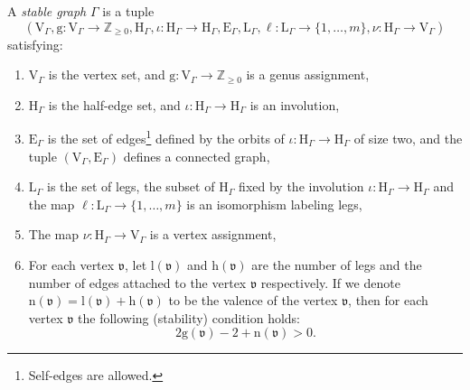 \documentclass[12pt]{amsart}
\numberwithin{equation}{section}
\begin{document}
A \textit{stable graph} $\Gamma$ is a tuple
\begin{equation*}
\left(\mathrm{V}_{\Gamma}, \mathrm{g}: \mathrm{V}_{\Gamma} \rightarrow \mathbb{Z}_{\geq 0},  \mathrm{H}_{\Gamma}, \iota: \mathrm{H}_{\Gamma} \rightarrow \mathrm{H}_{\Gamma}, \mathrm{E}_{\Gamma}, \mathrm{L}_{\Gamma}, \ell:\mathrm{L}_{\Gamma}\rightarrow\{1,\ldots,m\},  \nu: \mathrm{H}_{\Gamma} \rightarrow \mathrm{V}_{\Gamma}\right)
\end{equation*}
satisfying:
\begin{enumerate}
\item $\mathrm{V}_{\Gamma}$ is the vertex set, and $\mathrm{g}:\mathrm{V}_{\Gamma}\rightarrow\mathbb{Z}_{\geq 0}$ is a genus assignment,
    
\item $\mathrm{H}_{\Gamma}$ is the half-edge set, and $\iota: \mathrm{H}_{\Gamma} \rightarrow \mathrm{H}_{\Gamma}$ is an involution,
    
\item $\mathrm{E}_{\Gamma}$ is the set of edges\footnote{Self-edges are allowed.} defined by the orbits of $\iota: \mathrm{H}_{\Gamma} \rightarrow \mathrm{H}_{\Gamma}$ of size two, and the tuple $\left(\mathrm{V}_{\Gamma},\mathrm{E}_{\Gamma}\right)$ defines a connected graph,
    
\item $\mathrm{L}_{\Gamma}$ is the set of legs, the subset of $\mathrm{H}_{\Gamma}$ fixed by the involution $\iota: \mathrm{H}_{\Gamma} \rightarrow \mathrm{H}_{\Gamma}$ and the map $\ell:\mathrm{L}_{\Gamma}\rightarrow\{1,\ldots,m\}$ is an isomorphism labeling legs,

\item The map $\nu: \mathrm{H}_{\Gamma} \rightarrow \mathrm{V}_{\Gamma}$ is a vertex assignment,
    
\item For each vertex $\mathfrak{v}$, let $\mathrm{l}(\mathfrak{v})$ and $\mathrm{h}(\mathfrak{v})$ are the number of legs and the number of edges attached to the vertex $\mathfrak{v}$ respectively. If we denote $\mathrm{n}(\mathfrak{v})=\mathrm{l}(\mathfrak{v})+\mathrm{h}(\mathfrak{v})$ to be the valence of the vertex $\mathfrak{v}$, then for each vertex $\mathfrak{v}$ the following (stability) condition holds:
\begin{equation*}
2\mathrm{g}(\mathfrak{v})-2+\mathrm{n}(\mathfrak{v})>0.
\end{equation*}
\end{enumerate}
\end{document}

